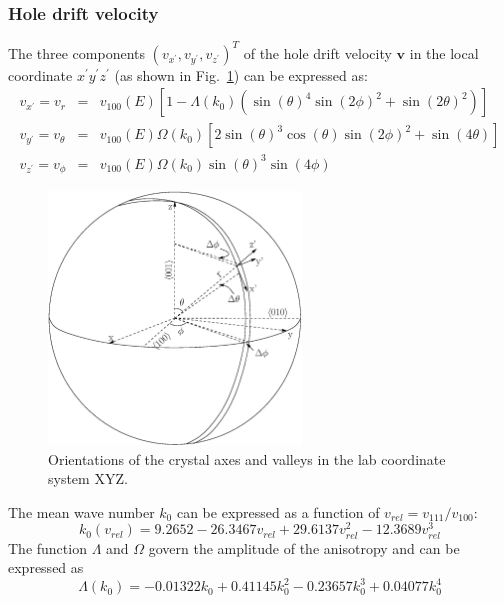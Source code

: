 \subsubsection{Hole drift velocity}
\label{sec:hole}
The three components $(v_{x^{\prime}}, v_{y^{\prime}}, v_{z^{\prime}})^{T}$ of the hole drift velocity $\mathbf{v}$ in the local coordinate $x^{\prime}y^{\prime}z^{\prime}$ (as shown in Fig.~\ref{fig:vsphere}) can be expressed as:
\begin{equation}
  \label{eq:vsphere}
  \begin{array}{rcl}
   v_{x^{\prime}} = v_{r} &=& v_{100}(E)[1-\Lambda(k_{0})(\sin(\theta)^{4}\sin(2\phi)^{2} + \sin(2\theta)^{2})]\\
   v_{y^{\prime}} = v_{\theta} &=& v_{100}(E)\Omega(k_{0})[2\sin(\theta)^{3}\cos(\theta)\sin(2\phi)^{2} + \sin(4\theta)]\\
    v_{z^{\prime}} = v_{\phi} &=& v_{100}(E)\Omega(k_{0})\sin(\theta)^{3}\sin(4\phi)
  \end{array}
\end{equation}
\begin{figure}[tbhp]
  \centering
  \includegraphics[width=0.6\textwidth]{vsphere.eps}  
  \caption{Orientations of the crystal axes and valleys in the lab
coordinate system XYZ.}
  \label{fig:vsphere}
\end{figure}
The mean wave number $k_{0}$ can be expressed as a function of $v_{rel} = v_{111}/v_{100}$:
\begin{equation}
  \label{eq:k0}
   k_{0}(v_{rel}) = 9.2652 - 26.3467v_{rel} + 29.6137v_{rel}^{2} - 12.3689v_{rel}^{3}
\end{equation}
The function $\Lambda$ and $\Omega$ govern the amplitude of the anisotropy and can be expressed as
\begin{equation}
  \label{eq:lamb}
   \Lambda(k_{0}) = -0.01322k_{0} + 0.41145k_{0}^{2} - 0.23657k_{0}^{3} + 0.04077k_{0}^{4}
\end{equation}
